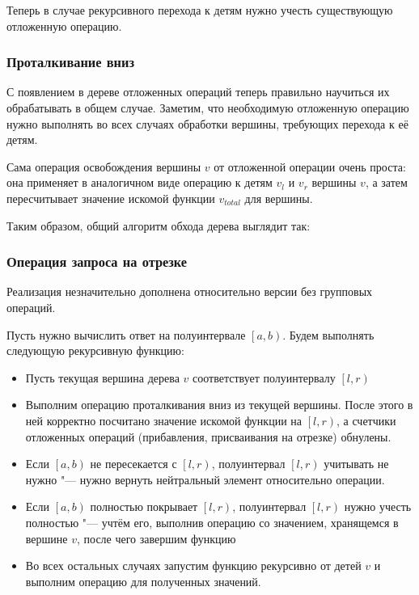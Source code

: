 \documentclass[a4paper,12pt]{article}
\begin{document}
      Теперь в случае рекурсивного перехода к детям нужно учесть
      существующую отложенную операцию.

      \subsubsection{Проталкивание вниз}

      С появлением в дереве отложенных операций теперь правильно
      научиться их обрабатывать в общем случае. Заметим, что
      необходимую отложенную операцию нужно выполнять во всех
      случаях обработки вершины, требующих перехода к её детям.

      Сама операция освобождения вершины $v$ от отложенной операции
      очень проста: она применяет в аналогичном виде операцию
      к детям $v_l$ и $v_r$ вершины $v$, а затем пересчитывает значение
      искомой функции $v_{total}$ для вершины.

      Таким образом, общий алгоритм обхода дерева выглядит так:

      \subsubsection{Операция запроса на отрезке}

      Реализация незначительно дополнена относительно версии
      без групповых операций.

      Пусть нужно вычислить ответ на полуинтервале
      $\left[a, b\right)$. Будем выполнять следующую
      рекурсивную функцию:
      \begin{itemize}
        \item Пусть текущая вершина дерева $v$ соответствует
          полуинтервалу $\left[l, r\right)$
        \item Выполним операцию проталкивания вниз из текущей
          вершины. После этого в ней корректно посчитано значение
          искомой функции на $\left[l, r\right)$, а счетчики
          отложенных операций (прибавления, присваивания на отрезке)
          обнулены.
        \item Если $\left[a, b\right)$ не пересекается с
          $\left[l, r\right)$, полуинтервал
          $\left[l, r\right)$ учитывать не нужно "---
          нужно вернуть нейтральный элемент относительно
          операции.
        \item Если $\left[a, b\right)$ полностью покрывает
          $\left[l, r\right)$, полуинтервал
          $\left[l, r\right)$ нужно учесть полностью "---
          учтём его, выполнив операцию со значением,
          хранящемся в вершине $v$,
          после чего завершим функцию
        \item Во всех остальных случаях запустим функцию
          рекурсивно от детей $v$ и выполним операцию для
          полученных значений.
      \end{itemize}
\end{document}
